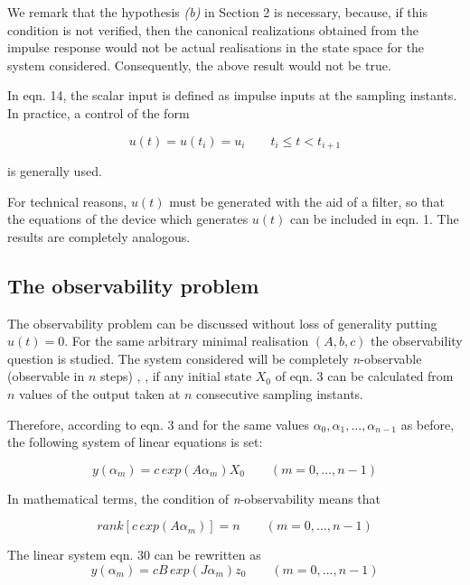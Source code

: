 \documentclass{article}
\begin{document}
We remark that the hypothesis \textit{(b)} in Section 2 is
necessary, because, if this condition is not verified, then the
canonical realizations obtained from the impulse response would
not be actual realisations in the state space for the system
considered. Consequently, the above result would not be true.

In eqn. 14, the scalar input is defined as impulse inputs at the
sampling instants. In practice, a control of the form

\begin{equation}\label{eq:29}
u(t) = u (t_i)=u_i \qquad t_i \leq t < t_{i+1}
\end{equation}

is generally used.

For technical reasons, $u(t)$ must be generated with the aid of a
filter, so that the equations of the device which generates $u(t)$
can be included in eqn. 1. The results are completely analogous.


\subsection{The observability problem}

The observability problem can be discussed without loss of
generality putting $u(t) = 0$. For the same arbitrary minimal
realisation $(A, b, c)$ the observability question is studied. The
system considered will be completely \textit{n}-observable
(observable in $n$ steps) \cite{Ackermann}, \cite{Troch}, if any
initial state $X_0$ of eqn. 3 can be calculated from $n$ values of
the output taken at $n$ consecutive sampling instants.

Therefore, according to eqn. 3 and for the same values $\alpha_0, \alpha_1, \ldots, \alpha_{n-1}$
as before, the following system of linear equations is set:

\begin{equation}\label{eq:30}
 y(\alpha_m)= c \, exp (A\alpha_{m})X_0 \qquad (m = 0, \ldots , n - 1)
\end{equation}

In mathematical terms, the condition of \textit{n}-observability means that

\begin{equation}\label{eq:31}
 rank[c \, exp (A\alpha_{m})]=n \qquad (m = 0, \ldots , n - 1)
\end{equation}

The linear system eqn. 30 can be rewritten as
\begin{equation}\label{eq:32}
 y(\alpha_m)= c B \,exp (J\alpha_{m})z_0 \qquad (m = 0, \ldots , n - 1)
\end{equation}
\end{document}
